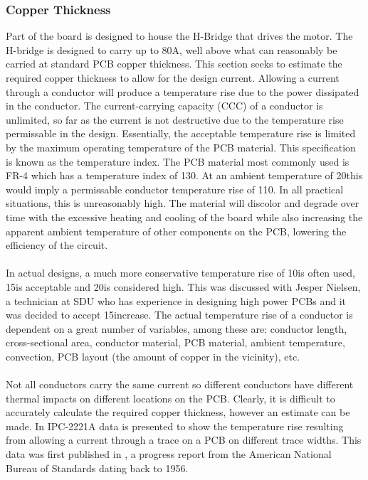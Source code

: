 \subsubsection{Copper Thickness}
Part of the board is designed to house the H-Bridge that drives the motor.
The H-bridge is designed to carry up to 80A, well above what can reasonably be carried at standard PCB copper thickness.
This section seeks to estimate the required copper thickness to allow for the design current.
Allowing a current through a conductor will produce a temperature rise due to the power dissipated in the conductor.
The current-carrying capacity (CCC) of a conductor is unlimited, so far as the current is not destructive due to the temperature rise permissable in the design.
Essentially, the acceptable temperature rise is limited by the maximum operating temperature of the PCB material.
This specification is known as the temperature index.
The PCB material most commonly used is FR-4 which has a temperature index of 130\degree \cite{fr4}.
At an ambient temperature of 20\degree this would imply a permissable conductor temperature rise of 110\degree.
In all practical situations, this is unreasonably high.
The material will discolor and degrade over time with the excessive heating and cooling of the board while also increasing the apparent ambient temperature of other components on the PCB, lowering the efficiency of the circuit.
\\~\\
In actual designs, a much more conservative temperature rise of 10\degree is often used, 15\degree is acceptable and 20\degree is considered high.
This was discussed with Jesper Nielsen, a technician at SDU who has experience in designing high power PCBs and it was decided to accept 15\degree increase. 
The actual temperature rise of a conductor is dependent on a great number of variables, among these are: conductor length, cross-sectional area, conductor material, PCB material, ambient temperature, convection, PCB layout (the amount of copper in the vicinity), etc.
\\~\\
Not all conductors carry the same current so different conductors have different thermal impacts on different locations on the PCB.
Clearly, it is difficult to accurately calculate the required copper thickness, however an estimate can be made.
In IPC-2221A \cite{ipc2221} data is presented to show the temperature rise resulting from allowing a current through a trace on a PCB on different trace widths.
This data was first published in \cite{conduct}, a progress report from the American National Bureau of Standards dating back to 1956.
